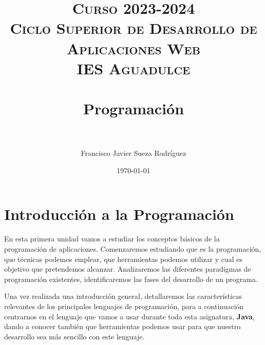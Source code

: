 


\title{
\normalfont \normalsize
\textsc{{\bfseries Curso 2023-2024} \\ Ciclo Superior de Desarrollo de Aplicaciones Web \\ IES Aguadulce} \\ [25pt]
\horrule{0.5pt} \\[0.4cm]
\huge Programación \\
\horrule{0.5pt} \\[0.4cm]
}

\author{Francisco Javier Sueza Rodríguez}
\date{\normalsize\today}

\makeglossaries
{}



\maketitle

\newpage

\tableofcontents

\listoffigures


\newpage

\chapter{Introducción a la Programación}

En esta primera unidad vamos a estudiar los conceptos básicos de la programación de aplicaciones. Comenzaremos estudiando que es la programación, que técnicas podemos emplear, que herramientas podemos utilizar y cual es objetivo que pretendemos alcanzar. Analizaremos las diferentes paradigmas de programación  existentes, identificaremos las fases del desarrollo de un programa.

Una vez realizada una introducción general, detallaremos las características relevantes de los principales lenguajes de programación, para a continuación centrarnos en el lenguaje que vamos a usar durante toda esta asignatura, \textbf{Java}, dando a conocer también que herramientas podemos usar para que nuestro desarrollo sea más sencillo con este lenguaje.

